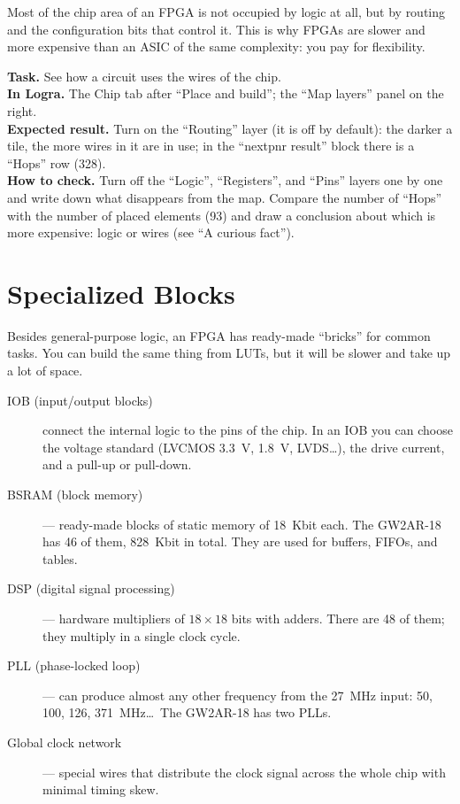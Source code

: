 \begin{infobox}
Most of the chip area of an FPGA is not occupied by logic at all, but by
routing and the configuration bits that control it. This is why FPGAs are
slower and more expensive than an ASIC of the same complexity: you pay for flexibility.
\end{infobox}

\begin{diybox}
\textbf{Task.} See how a circuit uses the wires of the chip.\\
\textbf{In Logra.} The Chip tab after ``Place and build''; the ``Map layers'' panel on the right.\\
\textbf{Expected result.} Turn on the ``Routing'' layer (it is off by default): the darker a tile, the more wires in it are in use; in the ``nextpnr result'' block there is a ``Hops'' row (328).\\
\textbf{How to check.} Turn off the ``Logic'', ``Registers'', and ``Pins'' layers one by one and write down what disappears from the map.  Compare the number of ``Hops'' with the number of placed elements (93) and draw a conclusion about which is more expensive: logic or wires (see ``A curious fact'').
\end{diybox}

\section{Specialized Blocks}

Besides general-purpose logic, an FPGA has ready-made ``bricks'' for common tasks.
You can build the same thing from LUTs, but it will be slower and take up a lot of space.

\begin{description}
  \item[IOB (input/output blocks)] connect the internal logic to the pins
    of the chip. In an IOB you can choose the voltage standard (LVCMOS 3.3~V,
    1.8~V, LVDS\ldots), the drive current, and a pull-up or pull-down.
  \item[BSRAM (block memory)] --- ready-made blocks of static memory of 18~Kbit each.
    The GW2AR-18 has 46 of them, 828~Kbit in total. They are used for buffers, FIFOs, and tables.
  \item[DSP (digital signal processing)] --- hardware multipliers
    of $18\times18$ bits with adders. There are 48 of them; they multiply in a single clock cycle.
  \item[PLL (phase-locked loop)] --- can produce almost any other frequency from the
    27~MHz input: 50, 100, 126, 371~MHz\ldots\
    The GW2AR-18 has two PLLs.
  \item[Global clock network] --- special wires that distribute
    the clock signal across the whole chip with minimal timing skew.
\end{description}

